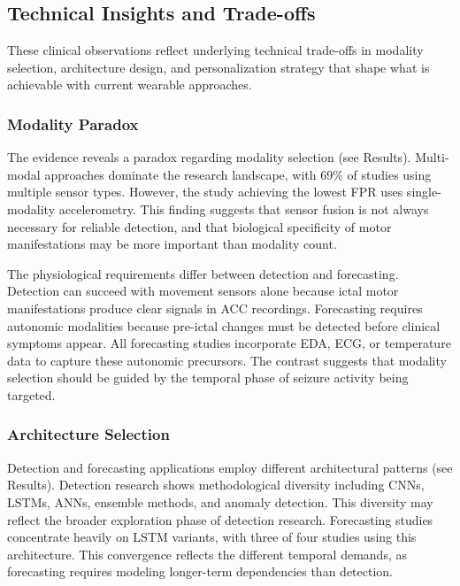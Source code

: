 \subsection{Technical Insights and Trade-offs}

These clinical observations reflect underlying technical trade-offs in modality selection, architecture design, and personalization strategy that shape what is achievable with current wearable approaches.

\subsubsection{Modality Paradox}

The evidence reveals a paradox regarding modality selection (see Results). Multi-modal approaches dominate the research landscape, with 69\% of studies using multiple sensor types. However, the study achieving the lowest FPR uses single-modality accelerometry. This finding suggests that sensor fusion is not always necessary for reliable detection, and that biological specificity of motor manifestations may be more important than modality count.

The physiological requirements differ between detection and forecasting. Detection can succeed with movement sensors alone because ictal motor manifestations produce clear signals in ACC recordings. Forecasting requires autonomic modalities because pre-ictal changes must be detected before clinical symptoms appear. All forecasting studies incorporate EDA, ECG, or temperature data to capture these autonomic precursors. The contrast suggests that modality selection should be guided by the temporal phase of seizure activity being targeted.

\subsubsection{Architecture Selection}

Detection and forecasting applications employ different architectural patterns (see Results). Detection research shows methodological diversity including CNNs, LSTMs, ANNs, ensemble methods, and anomaly detection. This diversity may reflect the broader exploration phase of detection research. Forecasting studies concentrate heavily on LSTM variants, with three of four studies using this architecture. This convergence reflects the different temporal demands, as forecasting requires modeling longer-term dependencies than detection.

